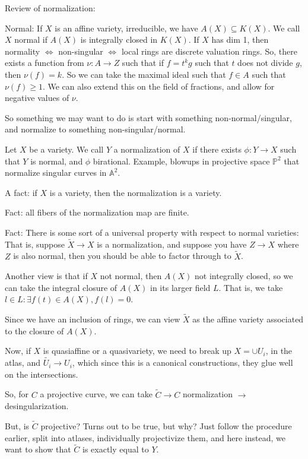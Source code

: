 \documentclass[10pt]{article}
\begin{document}
Review of normalization:

Normal: If $X$ is an affine variety, irreducible, we have $A(X) \subseteq K(X)$. We call $X$ normal if $A(X)$ is integrally closed in $K(X)$. If $X$ has dim 1, then normality $\iff$ non-singular $\iff$ local rings are discrete valuation rings. So, there exists a function from $\nu: A \to Z$ such that if $f = t^k g$ such that $t$ does not divide $g$, then $\nu(f) = k$. So we can take the maximal ideal such that $f \in A$ such that $\nu(f) \geq 1$. We can also extend this on the field of fractions, and allow for negative values of $\nu$. 

So something we may want to do is start with something non-normal/singular, and normalize to something non-singular/normal.

Let $X$  be a variety. We call $Y$ a normalization of $X$ if there exists $\phi: Y\to X$ such that $Y$ is normal, and $\phi$ birational. Example, blowups in projective space $\mathbb{P}^2$ that normalize singular curves in $\mathbb{A}^2$. 

A fact: if $X$ is a variety, then the normalization is a variety. 

Fact: all fibers of the normalization map are finite. 

Fact: There is some sort of a universal property with respect to normal varieties: That is, suppose $\tilde{X} \to X$ is a normalization, and suppose you have $Z \to X$ where $Z$ is also normal, then you should be able to factor through to $\tilde{X}$.

Another view is that if $X$ not normal, then $A(X)$ not integrally closed, so we can take the integral closure of $A(X)$ in its larger field $L$. That is, we take $l \in L : \exists f(t) \in A(X), f(l) = 0$.

Since we have an inclusion of rings, we can view $\tilde{X}$ as the affine variety associated to the closure of $A(X)$.

Now, if $X$ is quasiaffine or a quasivariety, we need to break up $X = \cup U_i$, in the atlas, and $\tilde{U_i} \to U_i$, which since this is a canonical constructions, they glue well on the intersections. 

So, for $C$ a projective curve, we can take $\tilde{C} \to C$ normalization $\to$ desingularization. 

But, is $\tilde{C}$ projective? Turns out to be true, but why? Just follow the procedure earlier, split into atlases, individually projectivize them, and here instead, we want to show that $\tilde{C}$ is exactly equal to $Y$.
\end{document}
